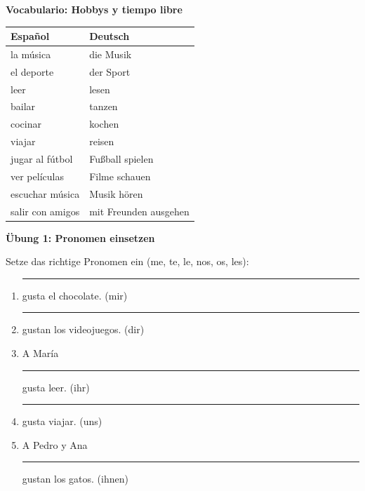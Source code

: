 \documentclass[10pt, a4paper]{article}
\newcommand{\fachfarbe}{spanisch}
\newcommand{\luecke}[1]{\rule{#1}{0.4pt}}
\newcommand{\abschnitt}[1]{%
    \vspace{8pt}
    \noindent\textbf{\textcolor{\fachfarbe}{#1}}
    \vspace{4pt}
}
\begin{document}
\begin{multicols}{2}
\vspace{6pt}


\abschnitt{Vocabulario: Hobbys y tiempo libre}

\begin{tabular}{|l|l|}
\hline
\textbf{Español} & \textbf{Deutsch} \\
\hline
la música & die Musik \\
\hline
el deporte & der Sport \\
\hline
leer & lesen \\
\hline
bailar & tanzen \\
\hline
cocinar & kochen \\
\hline
viajar & reisen \\
\hline
jugar al fútbol & Fußball spielen \\
\hline
ver películas & Filme schauen \\
\hline
escuchar música & Musik hören \\
\hline
salir con amigos & mit Freunden ausgehen \\
\hline
\end{tabular}


\columnbreak


\abschnitt{Übung 1: Pronomen einsetzen}

Setze das richtige Pronomen ein (me, te, le, nos, os, les):

\vspace{4pt}

\begin{enumerate}[leftmargin=2em]
\item \luecke{1.2cm} gusta el chocolate. (mir)
\item \luecke{1.2cm} gustan los videojuegos. (dir)
\item A María \luecke{1.2cm} gusta leer. (ihr)
\item \luecke{1.2cm} gusta viajar. (uns)
\item A Pedro y Ana \luecke{1.2cm} gustan los gatos. (ihnen)
\end{enumerate}


\end{multicols}
\end{document}

